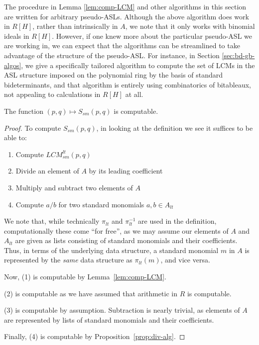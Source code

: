 \documentclass[11pt,reqno]{amsart}
\newcommand{\lcmlt}{LCM_{sm}^{lt}}
\newcommand{\Ssm}{S_{sm}}
\theoremstyle{definition}
\numberwithin{equation}{section}
\begin{document}
\begin{remark}
The procedure in Lemma \ref{lem:comp-LCM} and other algorithms in this section are written for arbitrary pseudo-ASLs. Although the above algorithm does work in $R[H]$, rather than intrinsically in $A$, we note that it only works with binomial ideals in $R[H]$. However, if one knew more about the particular pseudo-ASL we are working in, we can expect that the algorithms can be streamlined to take advantage of the structure of the pseudo-ASL. For instance, in Section \ref{sec:bd-gb-algos}, we give a specifically tailored algorithm to compute the set of LCMs in the ASL structure imposed on the polynomial ring by the basis of standard bideterminants, and that algorithm is entirely using combinatorics of bitableaux, not appealing to calculations in $R[H]$ at all.
\end{remark}

\begin{lemma} \label{lem:comp-Ssm}
The function $(p,q) \mapsto \Ssm(p,q)$ is computable.
\end{lemma}

\begin{proof}
To compute $\Ssm(p,q)$, in looking at the definition we see it suffices to be able to:
\begin{enumerate}
\item Compute $\lcmlt(p,q)$
\item Divide an element of $A$ by its leading coefficient
\item Multiply and subtract two elements of $A$
\item Compute $a / b$ for two standard monomials $a,b \in A_{lt}$
\end{enumerate}

We note that, while technically $\pi_{lt}$ and $\pi_{lt}^{-1}$ are used in the definition, computationally these come ``for free'', as we may assume our elements of $A$ and $A_{lt}$ are given as lists consisting of standard monomials and their coefficients. Thus, in terms of the underlying data structure, a standard monomial $m$ in $A$ is represented by the \emph{same} data structure as $\pi_{lt}(m)$, and vice versa.

Now, (1) is computable by Lemma~\ref{lem:comp-LCM}. 

(2) is computable as we have assumed that arithmetic in $R$ is computable.

(3) is computable by assumption. Subtraction is nearly trivial, as elements of $A$ are represented by lists of standard monomials and their coefficients.

Finally, (4) is computable by Proposition~\ref{prop:div-alg}.
\end{proof}
\end{document}
